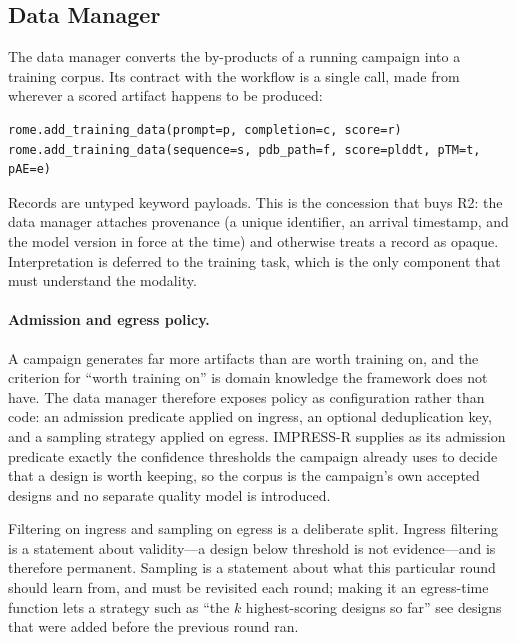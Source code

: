 \subsection{Data Manager}
\label{sec:design:data}

The data manager converts the by-products of a running campaign into a training
corpus. Its contract with the workflow is a single call, made from wherever a
scored artifact happens to be produced:

\begin{lstlisting}[style=rome]
rome.add_training_data(prompt=p, completion=c, score=r)
rome.add_training_data(sequence=s, pdb_path=f, score=plddt, pTM=t, pAE=e)
\end{lstlisting}

Records are untyped keyword payloads. This is the concession that buys R2: the
data manager attaches provenance (a unique identifier, an arrival timestamp, and
the model version in force at the time) and otherwise treats a record as opaque.
Interpretation is deferred to the training task, which is the only component
that must understand the modality.

\paragraph{Admission and egress policy.}
A campaign generates far more artifacts than are worth training on, and the
criterion for ``worth training on'' is domain knowledge the framework does not
have. The data manager therefore exposes policy as configuration rather than
code: an admission predicate applied on ingress, an optional deduplication key,
and a sampling strategy applied on egress. IMPRESS-R supplies as its admission
predicate exactly the confidence thresholds the campaign already uses to decide
that a design is worth keeping, so the corpus is the campaign's own accepted
designs and no separate quality model is introduced.

Filtering on ingress and sampling on egress is a deliberate split. Ingress
filtering is a statement about validity---a design below threshold is not
evidence---and is therefore permanent. Sampling is a statement about what this
particular round should learn from, and must be revisited each round; making it
an egress-time function lets a strategy such as ``the $k$ highest-scoring
designs so far'' see designs that were added before the previous round ran.

